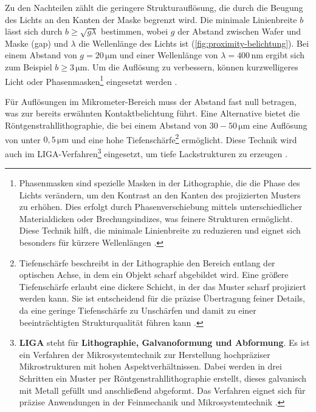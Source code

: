 \documentclass{article} %
\begin{document}
Zu den Nachteilen zählt die geringere Strukturauflösung, die durch die Beugung des Lichts an den Kanten der Maske begrenzt wird. Die minimale Linienbreite $b$ lässt sich durch $b \geq \sqrt{g\lambda}$ bestimmen, wobei $g$ der Abstand zwischen Wafer und Maske (gap) und $\lambda$ die Wellenlänge des Lichts ist (\autoref{fig:proximity-belichtung}). Bei einem Abstand von $g = 20 \, \mathrm{\mu m}$ und einer Wellenlänge von $\lambda = 400 \, \mathrm{nm}$ ergibt sich zum Beispiel $b \geq 3 \, \mathrm{\mu m}$. Um die Auflösung zu verbessern, können kurzwelligeres Licht oder Phasenmasken\footnote{Phasenmasken sind spezielle Masken in der Lithographie, die die Phase des Lichts verändern, um den Kontrast an den Kanten des projizierten Musters zu erhöhen. Dies erfolgt durch Phasenverschiebung mittels unterschiedlicher Materialdicken oder Brechungsindizes, was feinere Strukturen ermöglicht. Diese Technik hilft, die minimale Linienbreite zu reduzieren und eignet sich besonders für kürzere Wellenlängen \cite{Lin1992, Levenson1982, Mack2006}.} eingesetzt werden \cite{schmid2024}.

\vspace{1em}

Für Auflösungen im Mikrometer-Bereich muss der Abstand fast null betragen, was zur bereits erwähnten Kontaktbelichtung führt. Eine Alternative bietet die Röntgenstrahllithographie, die bei einem Abstand von $30-50 \, \mathrm{\mu m}$ eine Auflösung von unter $0,5 \, \mathrm{\mu m}$ und eine hohe Tiefenschärfe\footnote{Tiefenschärfe beschreibt in der Lithographie den Bereich entlang der optischen Achse, in dem ein Objekt scharf abgebildet wird. Eine größere Tiefenschärfe erlaubt eine dickere Schicht, in der das Muster scharf projiziert werden kann. Sie ist entscheidend für die präzise Übertragung feiner Details, da eine geringe Tiefenschärfe zu Unschärfen und damit zu einer beeinträchtigten Strukturqualität führen kann \cite{Mack2006}.} ermöglicht. Diese Technik wird auch im LIGA-Verfahren\footnote{\textbf{LIGA} steht für \textbf{Lithographie, Galvanoformung und Abformung}. Es ist ein Verfahren der Mikrosystemtechnik zur Herstellung hochpräziser Mikrostrukturen mit hohen Aspektverhältnissen. Dabei werden in drei Schritten ein Muster per Röntgenstrahllithographie erstellt, dieses galvanisch mit Metall gefüllt und anschließend abgeformt. Das Verfahren eignet sich für präzise Anwendungen in der Feinmechanik und Mikrosystemtechnik \cite{Mescheder2004}.} eingesetzt, um tiefe Lackstrukturen zu erzeugen \cite{Mescheder2004}.
\end{document}
